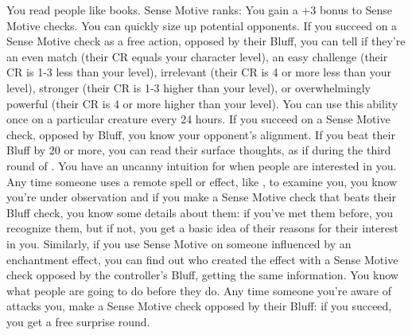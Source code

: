 \skillfeat
{You read people like books.}
{Sense Motive ranks:}
{You gain a +3 bonus to Sense Motive checks.}
{You can quickly size up potential opponents. If you succeed on a Sense Motive check as a free action, opposed by their Bluff, you can tell if they're an even match (their CR equals your character level), an easy challenge (their CR is 1-3 less than your level), irrelevant (their CR is 4 or more less than your level), stronger (their CR is 1-3 higher than your level), or overwhelmingly powerful (their CR is 4 or more higher than your level). You can use this ability once on a particular creature every 24 hours.}
{If you succeed on a Sense Motive check, opposed by Bluff, you know your opponent's alignment. If you beat their Bluff by 20 or more, you can read their surface thoughts, as if during the third round of .}
{You have an uncanny intuition for when people are interested in you. Any time someone uses a remote spell or effect, like , to examine you, you know you're under observation and if you make a Sense Motive check that beats their Bluff check, you know some details about them: if you've met them before, you recognize them, but if not, you get a basic idea of their reasons for their interest in you. Similarly, if you use Sense Motive on someone influenced by an enchantment effect, you can find out who created the effect with a Sense Motive check opposed by the controller's Bluff, getting the same information.}
{You know what people are going to do before they do. Any time someone you're aware of attacks you, make a Sense Motive check opposed by their Bluff: if you succeed, you get a free surprise round.}